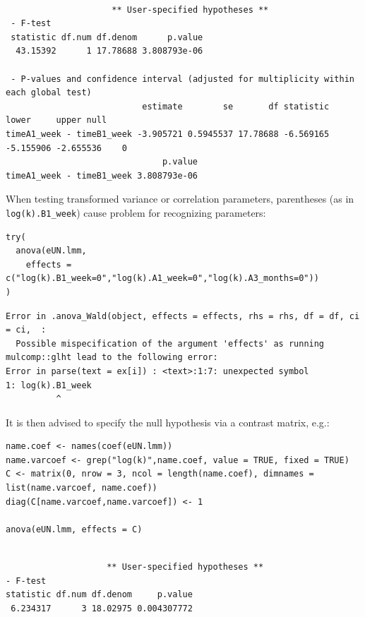 \documentclass[12pt]{article}
\begin{document}
\begin{verbatim}

                     ** User-specified hypotheses ** 
 - F-test
 statistic df.num df.denom      p.value
  43.15392      1 17.78688 3.808793e-06

 - P-values and confidence interval (adjusted for multiplicity within each global test) 
                           estimate        se       df statistic     lower     upper null
timeA1_week - timeB1_week -3.905721 0.5945537 17.78688 -6.569165 -5.155906 -2.655536    0
                               p.value
timeA1_week - timeB1_week 3.808793e-06
\end{verbatim}

When testing transformed variance or correlation parameters,
parentheses (as in \texttt{log(k).B1\_week}) cause problem for recognizing
parameters:
\lstset{language=r,label= ,caption= ,captionpos=b,numbers=none}
\begin{lstlisting}
try(
  anova(eUN.lmm,
	effects = c("log(k).B1_week=0","log(k).A1_week=0","log(k).A3_months=0"))
)
\end{lstlisting}

\begin{verbatim}
Error in .anova_Wald(object, effects = effects, rhs = rhs, df = df, ci = ci,  : 
  Possible mispecification of the argument 'effects' as running mulcomp::glht lead to the following error: 
Error in parse(text = ex[i]) : <text>:1:7: unexpected symbol
1: log(k).B1_week
          ^
\end{verbatim}


It is then advised to specify the null hypothesis via a contrast matrix, e.g.:
\lstset{language=r,label= ,caption= ,captionpos=b,numbers=none}
\begin{lstlisting}
name.coef <- names(coef(eUN.lmm))
name.varcoef <- grep("log(k)",name.coef, value = TRUE, fixed = TRUE)
C <- matrix(0, nrow = 3, ncol = length(name.coef), dimnames = list(name.varcoef, name.coef))
diag(C[name.varcoef,name.varcoef]) <- 1

anova(eUN.lmm, effects = C)
\end{lstlisting}

\begin{verbatim}

                    ** User-specified hypotheses ** 
- F-test
statistic df.num df.denom     p.value
 6.234317      3 18.02975 0.004307772
\end{verbatim}
\end{document}

